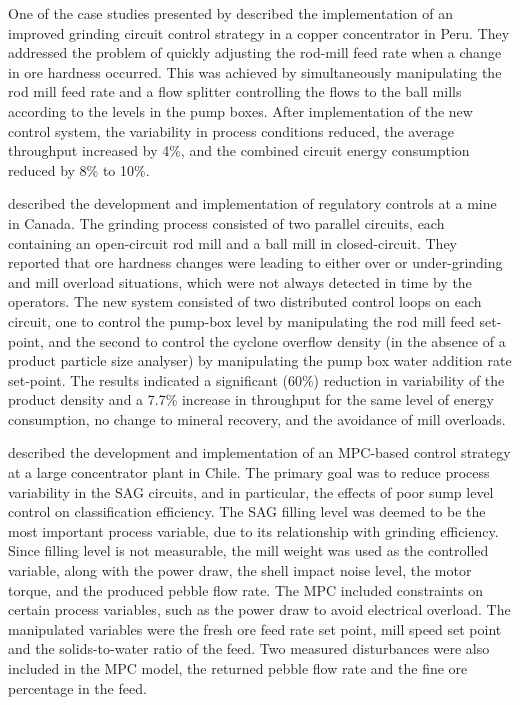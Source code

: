 One of the case studies presented by \cite{desbiens_using_2008} described the implementation of an improved grinding circuit control strategy in a copper concentrator in Peru. They addressed the problem of quickly adjusting the rod-mill feed rate when a change in ore hardness occurred. This was achieved by simultaneously manipulating the rod mill feed rate and a flow splitter controlling the flows to the ball mills according to the levels in the pump boxes. After implementation of the new control system, the variability in process conditions reduced, the average throughput increased by 4\%, and the combined circuit energy consumption reduced by 8\% to 10\%.

\cite{nunez_self-optimizing_2009} described the development and implementation of regulatory controls at a mine in Canada. The grinding process consisted of two parallel circuits, each containing an open-circuit rod mill and a ball mill in closed-circuit. They reported that ore hardness changes were leading to either over or under-grinding and mill overload situations, which were not always detected in time by the operators. The new system consisted of two distributed control loops on each circuit, one to control the pump-box level by manipulating the rod mill feed set-point, and the second to control the cyclone overflow density (in the absence of a product particle size analyser) by manipulating the pump box water addition rate set-point. The results indicated a significant (60\%) reduction in variability of the product density and a 7.7\% increase in throughput for the same level of energy consumption, no change to mineral recovery, and the avoidance of mill overloads.

\cite{yutronic_sag_2011} described the development and implementation of an \gls{MPC}-based control strategy at a large concentrator plant in Chile. The primary goal was to reduce process variability in the \acrshort{SAG} circuits, and in particular, the effects of poor sump level control on classification efficiency. The \acrshort{SAG} filling level was deemed to be the most important process variable, due to its relationship with grinding efficiency. Since filling level is not measurable, the mill weight was used as the controlled variable, along with the power draw, the shell impact noise level, the motor torque, and the produced pebble flow rate. The \gls{MPC} included constraints on certain process variables, such as the power draw to avoid electrical overload. The manipulated variables were the fresh ore feed rate set point, mill speed set point and the solids-to-water ratio of the feed. Two measured disturbances were also included in the \gls{MPC} model, the returned pebble flow rate and the fine ore percentage in the feed.

